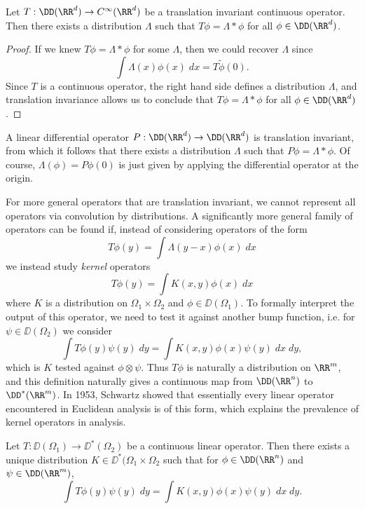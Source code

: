 \begin{theorem}
  Let $T: \DD(\RR^d) \to C^\infty(\RR^d)$ be a translation invariant continuous operator. Then there exists a distribution $\Lambda$ such that $T\phi = \Lambda * \phi$ for all $\phi \in \DD(\RR^d)$.
\end{theorem}
\begin{proof}
  If we knew $T\phi = \Lambda * \phi$ for some $\Lambda$, then we could recover $\Lambda$ since
  \[ \int \Lambda(x) \phi(x)\; dx = T \tilde{\phi}(0). \]
  Since $T$ is a continuous operator, the right hand side defines a distribution $\Lambda$, and translation invariance allows us to conclude that $T\phi = \Lambda * \phi$ for all $\phi \in \DD(\RR^d)$.
\end{proof}

\begin{example}
        A linear differential operator $P: \DD(\RR^d) \to \DD(\RR^d)$ is translation invariant, from which it follows that there exists a distribution $\Lambda$ such that $P\phi = \Lambda * \phi$. Of course, $\Lambda(\phi) = P\phi(0)$ is just given by applying the differential operator at the origin.
\end{example}

For more general operators that are translation invariant, we cannot represent all operators via convolution by distributions. A significantly more general family of operators can be found if, instead of considering operators of the form
%
\[ T\phi(y) = \int \Lambda(y - x) \phi(x)\; dx \]
%
we instead study \emph{kernel} operators
%
\[ T\phi(y) = \int K(x,y) \phi(x)\; dx \]
%
where $K$ is a distribution on $\Omega_1 \times \Omega_2$ and $\phi \in \DD(\Omega_1)$. To formally interpret the output of this operator, we need to test it against another bump function, i.e. for $\psi \in \DD(\Omega_2)$ we consider
%
\[ \int T\phi(y) \psi(y)\; dy = \int K(x,y) \phi(x) \psi(y)\; dx\; dy, \]
%
which is $K$ tested against $\phi \otimes \psi$. Thus $T\phi$ is naturally a distribution on $\RR^m$, and this definition naturally gives a continuous map from $\DD(\RR^n)$ to $\DD^*(\RR^m)$. In 1953, Schwartz showed that essentially every linear operator encountered in Euclidean analysis is of this form, which explains the prevalence of kernel operators in analysis.

\begin{theorem}
  Let $T: \DD(\Omega_1) \to \DD^*(\Omega_2)$ be a continuous linear operator. Then there exists a unique distribution $K \in \DD^*(\Omega_1 \times \Omega_2$ such that for $\phi \in \DD(\RR^n)$ and $\psi \in \DD(\RR^m)$,
  \[ \int T\phi(y) \psi(y)\; dy = \int K(x,y) \phi(x) \psi(y)\; dx\; dy. \]
\end{theorem}

